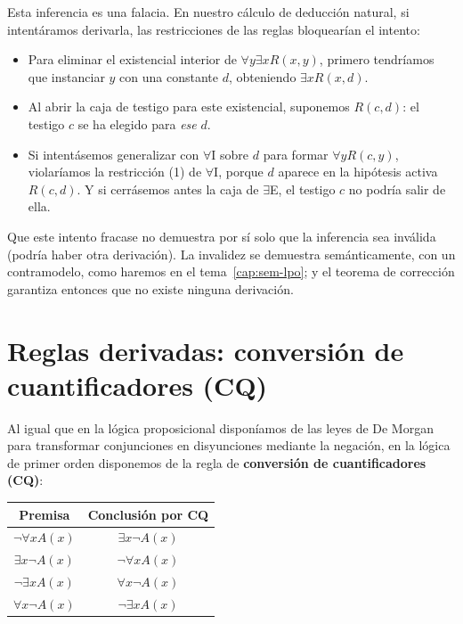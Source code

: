 Esta inferencia es una falacia. En nuestro cálculo de deducción natural, si intentáramos derivarla, las restricciones de las reglas bloquearían el intento:
\begin{itemize}
    \item Para eliminar el existencial interior de $\forall y \exists x R(x, y)$, primero tendríamos que instanciar $y$ con una constante $d$, obteniendo $\exists x R(x, d)$.
    \item Al abrir la caja de testigo para este existencial, suponemos $R(c, d)$: el testigo $c$ se ha elegido para \emph{ese} $d$.
    \item Si intentásemos generalizar con $\forall\text{I}$ sobre $d$ para formar $\forall y R(c, y)$, violaríamos la restricción (1) de $\forall$I, porque $d$ aparece en la hipótesis activa $R(c, d)$. Y si cerrásemos antes la caja de $\exists$E, el testigo $c$ no podría salir de ella.
\end{itemize}
Que este intento fracase no demuestra por sí solo que la inferencia sea inválida (podría haber otra derivación). La invalidez se demuestra semánticamente, con un contramodelo, como haremos en el tema~\ref{cap:sem-lpo}; y el teorema de corrección garantiza entonces que no existe ninguna derivación.

\section{Reglas derivadas: conversión de cuantificadores (CQ)}\label{sec:cq}

Al igual que en la lógica proposicional disponíamos de las leyes de De Morgan para transformar conjunciones en disyunciones mediante la negación, en la lógica de primer orden disponemos de la regla de \textbf{conversión de cuantificadores (CQ)}:

\begin{center}
\begin{tabular}{|c|c|}
\hline
\textbf{Premisa} & \textbf{Conclusión por CQ} \\
\hline
$\neg \forall x A(x)$ & $\exists x \neg A(x)$ \\
$\exists x \neg A(x)$ & $\neg \forall x A(x)$ \\
$\neg \exists x A(x)$ & $\forall x \neg A(x)$ \\
$\forall x \neg A(x)$ & $\neg \exists x A(x)$ \\
\hline
\end{tabular}
\end{center}

